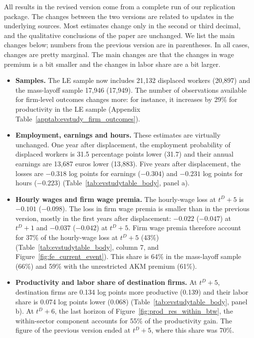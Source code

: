 \documentclass[11pt]{article}
\newcommand{\answer}[1]{\begingroup\color{navy}#1\endgroup}
\begin{document}
\answer{All results in the revised version come from a complete run of our replication package. The changes between the two versions are related to updates in the underlying sources. Most estimates change only in the second or third decimal, and the qualitative conclusions of the paper are unchanged. We list the main changes below; numbers from the previous version are in parentheses. In all cases, changes are pretty marginal. The main changes are that the changes in wage premium is a bit smaller and the changes in labor share are a bit larger. 

\begin{itemize}[leftmargin=*]
\item \textbf{Samples.} The LE sample now includes 21,132 displaced workers (20,897) and the mass-layoff sample 17,946 (17,949). The number of observations available for firm-level outcomes changes more: for instance, it increases by 29\% for productivity in the LE sample (Appendix Table~\ref{apptab:evstudy_firm_outcomes}).

\item \textbf{Employment, earnings and hours.} These estimates are virtually unchanged. One year after displacement, the employment probability of displaced workers is 31.5 percentage points lower (31.7) and their annual earnings are 13,687 euros lower (13,883). Five years after displacement, the losses are $-0.318$ log points for earnings ($-0.304$) and $-0.231$ log points for hours ($-0.223$) (Table~\ref{tab:evstudytable_body}, panel a).

\item \textbf{Hourly wages and firm wage premia.} The hourly-wage loss at $t^D+5$ is $-0.101$ ($-0.098$). The loss in firm wage premia is smaller than in the previous version, mostly in the first years after displacement: $-0.022$ ($-0.047$) at $t^D+1$ and $-0.037$ ($-0.042$) at $t^D+5$. Firm wage premia therefore account for 37\% of the hourly-wage loss at $t^D+5$ (43\%) (Table~\ref{tab:evstudytable_body}, column 7, and Figure~\ref{fig:fe_current_event}). This share is 64\% in the mass-layoff sample (66\%) and 59\% with the unrestricted AKM premium (61\%).

\item \textbf{Productivity and labor share of destination firms.} At $t^D+5$, destination firms are 0.134 log points more productive (0.139) and their labor share is 0.074 log points lower (0.068) (Table~\ref{tab:evstudytable_body}, panel b). At $t^D+6$, the last horizon of Figure~\ref{fig:prod_res_within_btw}, the within-sector component accounts for 55\% of the productivity gain. The figure of the previous version ended at $t^D+5$, where this share was 70\%.


\end{itemize}}
\end{document}
